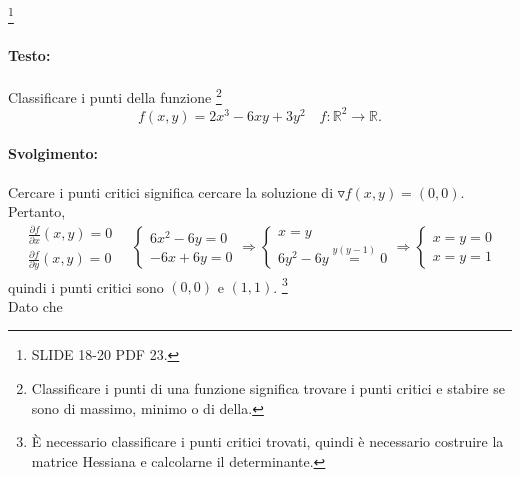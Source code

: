 \begin{example}
	 \footnote{SLIDE 18-20 PDF 23.}
	\leavevmode\paragraph{Testo:} Classificare i punti della funzione \footnote{Classificare i punti di una funzione significa trovare i punti critici e stabire se sono di massimo, minimo o di della.}
	\begin{equation*}
		f(x,y) = 2x^3-6xy + 3y^2 \quad f:\mathbb{R}^2 \rightarrow\mathbb{R}.
	\end{equation*}
	\paragraph{Svolgimento:} Cercare i punti critici significa cercare la soluzione di $\triangledown f(x,y)=(0,0)$. Pertanto,
	\begin{equation*}
		\begin{matrix}
			\frac{\partial f}{\partial x}(x,y)=0\\
			\frac{\partial f}{\partial y}(x,y)=0
		\end{matrix}\quad
		\begin{cases}
		6x^2 - 6y = 0\\
		-6x + 6y = 0
		\end{cases}\Rightarrow
		\begin{cases}
			x = y\\
			6y^2 - 6 y \overset{y(y-1)}{=}  0 
		\end{cases}\Rightarrow
		\begin{cases}
			x = y = 0\\
			x = y = 1
		\end{cases}
	\end{equation*}
	quindi i punti critici sono $(0,0)$ e $(1,1)$.
	\footnote{È necessario classificare i punti critici trovati, quindi è necessario costruire la matrice Hessiana e calcolarne il determinante.}\\
	Dato che
	

\end{example}
